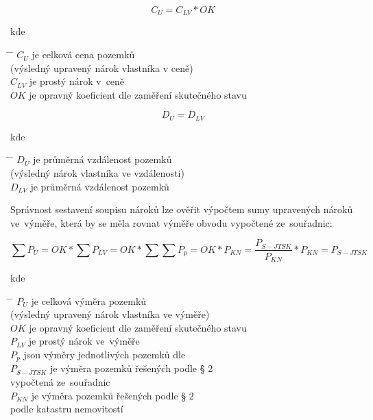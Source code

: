 \begin{equation} C_{U} = C_{LV}*OK
\end{equation}

kde
\begin{tabbing} \hspace{2em} \= \hspace{5em} \= \kill \> $C_{U}$ \> je
celková cena pozemků \\ \> \> (výsledný upravený nárok vlastníka v ceně) \\
\> $C_{LV}$ \> je prostý nárok v~ceně \\ \> $OK$ \> je opravný koeficient
dle zaměření skutečného stavu
\end{tabbing}

\newpage

\begin{equation} D_{U} = D_{LV}
\end{equation}

kde
\begin{tabbing} \hspace{2em} \= \hspace{5em} \= \kill \> $D_{U}$ \> je
průměrná vzdálenost pozemků \\ \> \> (výsledný nárok vlastníka ve vzdálenosti)
\\ \> $D_{LV}$ \> je průměrná vzdálenost pozemků
\end{tabbing}

Správnost sestavení soupisu nároků lze ověřit výpočtem sumy upravených
nároků ve~výměře, která by se měla rovnat výměře obvodu 
vypočtené ze~souřadnic:

\begin{equation} \sum\nolimits P_{U} = OK*\sum\nolimits P_{LV} = OK *
\sum\nolimits \sum\nolimits P_{p} = OK*P_{KN} =
\frac{P_{S-JTSK}}{P_{KN}}*P_{KN} = P_{S-JTSK}
\end{equation}

kde
\begin{tabbing} \hspace{2em} \= \hspace{5em} \= \kill \> $P_{U}$ \> je
celková výměra pozemků \\ \> \>(výsledný upravený nárok vlastníka ve výměře)
\\ \> $OK$ \> je opravný koeficient dle zaměření skutečného stavu \\
\> $P_{LV}$ \> je prostý nárok ve~výměře \\ \> $P_{p}$ \> jsou výměry
jednotlivých pozemků dle  \\ \> $P_{S-JTSK}$ \> je výměra pozemků
řešených podle § 2 \\ \> \> vypočtená ze~souřadnic \\ \> $P_{KN}$ \>
je výměra pozemků řešených podle § 2 \\ \> \> podle katastru nemovitostí
\end{tabbing}

